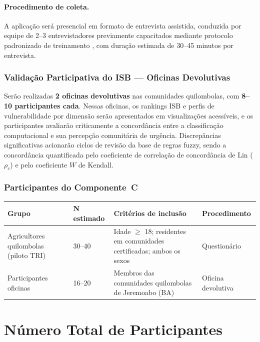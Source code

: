 \documentclass[12pt,a4paper,brazil]{article}
\begin{document}
\paragraph{Procedimento de coleta.} A aplicação será presencial em formato de entrevista assistida, conduzida por equipe de 2--3 entrevistadores previamente capacitados mediante protocolo padronizado de treinamento \citep{Fowler2014}, com duração estimada de 30--45 minutos por entrevista.

\subsubsection{Validação Participativa do ISB --- Oficinas Devolutivas}

Serão realizadas \textbf{2 oficinas devolutivas} nas comunidades quilombolas, com \textbf{8--10 participantes cada}. Nessas oficinas, os rankings ISB e perfis de vulnerabilidade por dimensão serão apresentados em visualizações acessíveis, e os participantes avaliarão criticamente a concordância entre a classificação computacional e sua percepção comunitária de urgência. Discrepâncias significativas acionarão ciclos de revisão da base de regras fuzzy, sendo a concordância quantificada pelo coeficiente de correlação de concordância de Lin ($\rho_c$) e pelo coeficiente $W$ de Kendall.

\subsubsection{Participantes do Componente~C}

\begin{longtable}{p{4cm}p{2.5cm}p{5.5cm}p{2cm}}
\toprule
\textbf{Grupo} & \textbf{N estimado} & \textbf{Critérios de inclusão} & \textbf{Procedimento} \\
\midrule
\endhead
Agricultores quilombolas (piloto TRI) & 30--40 & Idade $\geq$ 18; residentes em comunidades certificadas; ambos os sexos & Questionário \\
Participantes oficinas & 16--20 & Membros das comunidades quilombolas de Jeremoabo (BA) & Oficina devolutiva \\
\bottomrule
\end{longtable}


\section{Número Total de Participantes}
\end{document}
